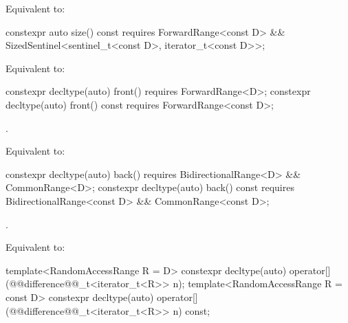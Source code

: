 \begin{itemdescr}
\pnum
\effects Equivalent to: 
\end{itemdescr}

%
\begin{itemdecl}
constexpr auto size() const requires ForwardRange<const D> &&
  SizedSentinel<sentinel_t<const D>, iterator_t<const D>>;
\end{itemdecl}

\begin{itemdescr}
\pnum
\effects Equivalent to: 
\end{itemdescr}

%
\begin{itemdecl}
constexpr decltype(auto) front() requires ForwardRange<D>;
constexpr decltype(auto) front() const requires ForwardRange<const D>;
\end{itemdecl}

\begin{itemdescr}
\pnum
\oldtxt{\requires} \newtxt{\expects}
.

\pnum
\effects Equivalent to: 
\end{itemdescr}

%
\begin{itemdecl}
constexpr decltype(auto) back()
  requires BidirectionalRange<D> && CommonRange<D>;
constexpr decltype(auto) back() const
  requires BidirectionalRange<const D> && CommonRange<const D>;
\end{itemdecl}

\begin{itemdescr}
\pnum
\oldtxt{\requires} \newtxt{\expects}
.

\pnum
\effects Equivalent to: 
\end{itemdescr}

%
\begin{itemdecl}
template<RandomAccessRange R = D>
constexpr decltype(auto) operator[](@@difference@@_t<iterator_t<R>> n);
template<RandomAccessRange R = const D>
constexpr decltype(auto) operator[](@@difference@@_t<iterator_t<R>> n) const;
\end{itemdecl}

